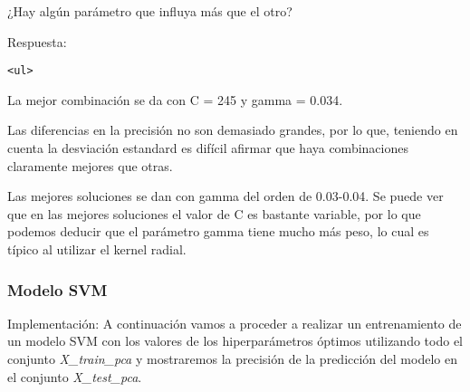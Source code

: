 \documentclass[11pt]{article}
\begin{document}
¿Hay algún parámetro que influya más que el otro?

    Respuesta:

\begin{verbatim}
<ul>
\end{verbatim}

La mejor combinación se da con C = 245 y gamma = 0.034.

Las diferencias en la precisión no son demasiado grandes, por lo que,
teniendo en cuenta la desviación estandard es difícil afirmar que haya
combinaciones claramente mejores que otras.

Las mejores soluciones se dan con gamma del orden de 0.03-0.04. Se puede
ver que en las mejores soluciones el valor de C es bastante variable,
por lo que podemos deducir que el parámetro gamma tiene mucho más peso,
lo cual es típico al utilizar el kernel radial.\\

    \hypertarget{modelo-svm}{%
\subsubsection{Modelo SVM}\label{modelo-svm}}

Implementación: A continuación vamos a proceder a realizar un
entrenamiento de un modelo SVM con los valores de los hiperparámetros
óptimos utilizando todo el conjunto \emph{X\_train\_pca} y mostraremos
la precisión de la predicción del modelo en el conjunto
\emph{X\_test\_pca}.
\end{document}
